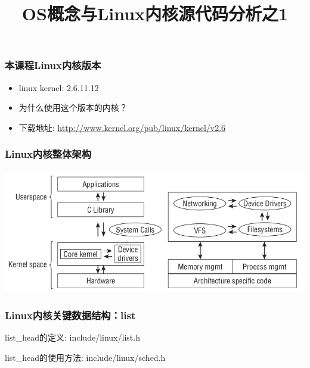 \documentclass[xcolor=svgnames]{beamer}
\begin{document}
\begin{CJK*}{UTF8}{gbsn}


\title{OS概念与Linux内核源代码分析之1}

\begin{frame}
\maketitle
\end{frame}



\begin{frame}[fragile]
\frametitle{本课程Linux内核版本}
\begin{itemize}
\item linux kernel: 2.6.11.12 
\item 为什么使用这个版本的内核？
\item 下载地址: \url{http://www.kernel.org/pub/linux/kernel/v2.6}
\end{itemize}
\end{frame}

\begin{frame}[fragile]%
\frametitle{Linux内核整体架构}
\includegraphics[width=1.0\textwidth]{kernel.png}
\end{frame}

\begin{frame}[fragile]%
\frametitle{Linux内核关键数据结构：list}
\begin{block}{list\_head的定义: include/linux/list.h}
\lstlisthead
\end{block}
\begin{block}{list\_head的使用方法: include/linux/sched.h}
\lstlistheadusage
\end{block}
\end{frame}


\end{CJK*}
\end{document}
